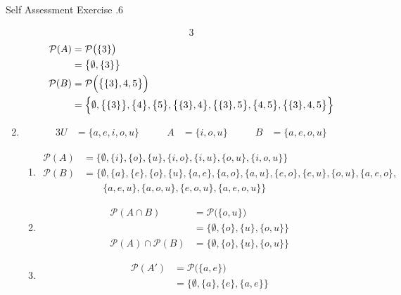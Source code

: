 \documentclass[../notes.tex]{subfiles}
\begin{document}
\begin{exercise}{Self Assessment Exercise \thechapter.6}
\begin{enumerate}
\begin{alignat*}{3}
            \end{alignat*}
            \begin{align*}
              \mathcal{P}(A) &= \mathcal{P}\bigl(\{3\}\bigr)\\
              &= \bigl\{\emptyset, \{3\}\bigr\}\\
              \mathcal{P}(B) &= \mathcal{P}\Bigl(\bigl\{\{3\}, 4, 5\bigr\}\Bigr)\\
              &= \Bigl\{\emptyset, \bigl\{\{3\}\bigr\}, \bigl\{4\bigr\}, \bigl\{5\bigr\}, \bigl\{\{3\}, 4\bigr\}, \bigl\{\{3\}, 5\bigr\}, \bigl\{4, 5\bigr\}, \bigl\{\{3\}, 4, 5\bigr\}\Bigr\}
            \end{align*}
          \pagebreak
          \item \moveup
            \begin{alignat*}{3}
              U &= \{a, e, i, o, u\} \qquad & A &= \{i, o, u\} \qquad & B &= \{a, e, o, u\}
            \end{alignat*}
            \begin{enumerate}[label=(\alph*)]
              \item \moveup
                \begin{align*}
                  \mathcal{P}(A) &= \bigl\{\emptyset, \{i\}, \{o\}, \{u\}, \{i, o\}, \{i, u\}, \{o, u\}, \{i, o, u\}\bigr\}\\
                  \mathcal{P}(B) &= \bigl\{\emptyset, \{a\}, \{e\}, \{o\}, \{u\}, \{a, e\}, \{a, o\}, \{a, u\}, \{e, o\}, \{e, u\}, \{o, u\}, \{a, e, o\},\\
                  & \qquad \{a, e, u\}, \{a, o, u\}, \{e, o, u\}, \{a, e, o, u\}\bigr\}
                \end{align*}
              \item \moveup
                \begin{align*}
                  \mathcal{P}(A \cap B) &= \mathcal{P}\bigl(\{o, u\}\bigr)\\
                  &= \bigl\{\emptyset, \{o\}, \{u\}, \{o, u\}\bigr\}\\
                  \mathcal{P}(A) \cap \mathcal{P}(B) &= \bigl\{\emptyset, \{o\}, \{u\}, \{o, u\}\bigr\}
                \end{align*}
              \item \moveup
                \begin{align*}
                  \mathcal{P}\left(A'\right) &= \mathcal{P}\bigl(\{a, e\}\bigr)\\
                  &= \bigl\{\emptyset, \{a\}, \{e\}, \{a, e\}\bigr\}

\end{align*}
\end{enumerate}
\end{enumerate}
\end{exercise}
\end{document}
